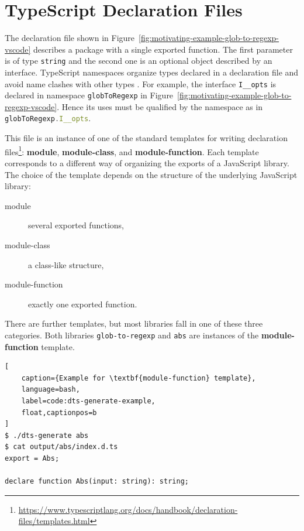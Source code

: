 \documentclass[english,cleveref,autoref,submission]{programming}
\newcommand{\figref}[1]{Figure~\ref{#1}}
\begin{document}

\section{TypeScript Declaration Files}
\label{sec:typescr-decl-files}

The declaration file shown in \figref{fig:motivating-example-glob-to-regexp-vscode}
describes a package with a single exported function. The first parameter is of type
\texttt{string} and the second one is an optional object described by an interface. TypeScript namespaces
organize types declared in a declaration file and avoid name clashes with other types
\cite{typescript-namespaces}. For example, the interface
\lstinline[language=TypeScript]{I__opts} is declared in namespace
\lstinline[language=TypeScript]{globToRegexp} in
\figref{fig:motivating-example-glob-to-regexp-vscode}. Hence its uses
must be qualified by the namespace as in
\lstinline[language=TypeScript]{globToRegexp.I__opts}.


This file is an instance of one of the standard templates for writing
declaration
files\footnote{\url{https://www.typescriptlang.org/docs/handbook/declaration-files/templates.html}}:
\textbf{module}, \textbf{module-class}, and
\textbf{module-function}. 
Each template corresponds to a different way of organizing the exports
of a JavaScript library. The choice of the template depends on the
structure of the underlying JavaScript library:
\begin{description}
\item[module] several exported functions,
\item[module-class] a class-like structure,
\item[module-function] exactly one exported function.
\end{description}
There are further templates, but most libraries fall in one of these
three categories.
Both libraries \texttt{glob-to-regexp} and \texttt{abs} are instances of the
\textbf{module-function} template.


\begin{lstlisting}[
    caption={Example for \textbf{module-function} template},
    language=bash,
	label=code:dts-generate-example,
    float,captionpos=b
]
$ ./dts-generate abs
$ cat output/abs/index.d.ts 
export = Abs;

declare function Abs(input: string): string;
\end{lstlisting}
\end{document}
